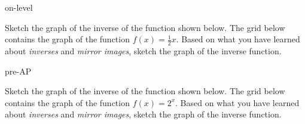 \begin{taggedblock}{on-level}
    \begin{myExample}{Sketch the graph of the inverse of the function shown below.}
        The grid below contains the graph of the function $f(x) = \frac{1}{2}x$. 
        Based on what you have learned about \emph{inverses} and \emph{mirror images},
        sketch the graph of the inverse function.

        \begin{center}
        \end{center}
    \end{myExample}
\end{taggedblock}



\begin{taggedblock}{pre-AP}
    \begin{myExample}{Sketch the graph of the inverse of the function shown below.}
        The grid below contains the graph of the function $f(x) = 2^x$. 
        Based on what you have learned about \emph{inverses} and \emph{mirror images},
        sketch the graph of the inverse function.

        \begin{center}
        \end{center}
    \end{myExample}    
\end{taggedblock}